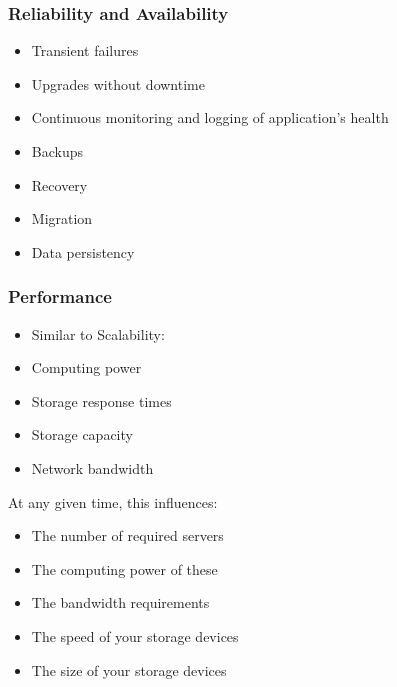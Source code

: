 \documentclass[10pt]{beamer}
\begin{document}
\begin{frame}[t]
\frametitle{Reliability and Availability}
\begin{itemize}
\item Transient failures
\item Upgrades without downtime
\item Continuous monitoring and logging of application’s health
\item Backups
\item Recovery
\item Migration
\item Data persistency
\end{itemize}

\end{frame}

\begin{frame}[t]
\frametitle{Performance}
\begin{itemize}
\item Similar to Scalability:
\item Computing power
\item Storage response times
\item Storage capacity
\item Network bandwidth
\end{itemize}

At any given time, this influences:
\begin{itemize}
\item The number of required servers
\item The computing power of these
\item The bandwidth requirements
\item The speed of your storage devices
\item The size of your storage devices
\end{itemize}

\end{frame}
\end{document}
